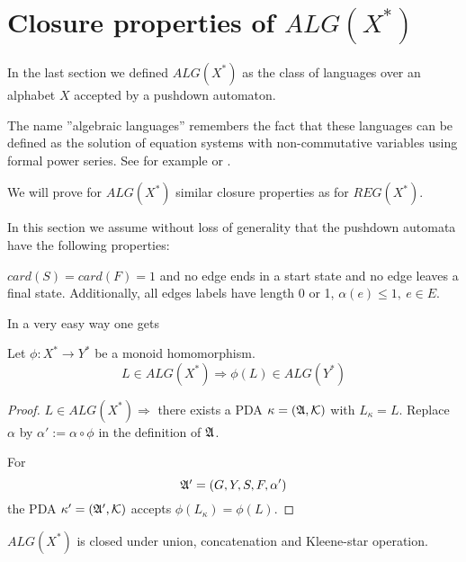 \section{Closure properties of $ALG(X^*)$}

In the last section we defined $ALG(X^*)$ as the class of languages over an
alphabet $X$ accepted by a pushdown automaton.

The name ''algebraic languages'' remembers the fact that these languages can be
defined as the solution of equation systems with non-commutative variables using
formal power series. See for example \cite{SaSo} or \cite{Berstel77}.

We will prove for $ALG(X^*)$ similar closure properties as for $REG(X^*)$.

In this section we assume without loss of generality that the pushdown automata
have the following properties:

$card(S) = card(F) = 1$ and no edge ends in a start state and no edge leaves a
final state. Additionally, all edges labels have length 0 or 1, $\alpha(e) \leq
1,\ e \in E$.

In a very easy way one gets

\begin{theorem}
Let $\phi : X^* \to Y^*$ be a monoid homomorphism.
\[ L \in ALG(X^*) \Rightarrow \phi(L) \in ALG(Y^*) \]
\end{theorem} 

\begin{proof}
$L \in ALG(X^*) \Rightarrow$ there exists a PDA $\kappa = (\mbox{$\mathfrak{A}$}, \mbox{$\mathcal{K}$})$
with $L_{\kappa} = L$. Replace $\alpha$ by $\alpha' := \alpha \circ \phi$ in
the definition of $\mbox{$\mathfrak{A}$}$. 

For
\[ \mbox{$\mathfrak{A'}$} = (G, Y, S, F, \alpha') \]
the PDA $\kappa' = (\mbox{$\mathfrak{A'}$}, \mbox{$\mathcal{K}$})$ accepts $\phi(L_{\kappa}) = \phi(L)$.
\end{proof}

\begin{theorem}
$ALG(X^*)$ is closed under union, concatenation and Kleene-star operation.
\end{theorem}

